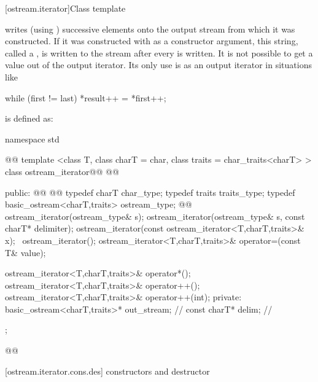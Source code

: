 %
\begin{itemdescr}
\pnum
\returns
{}
\end{itemdescr}

[ostream.iterator]{Class template }

\pnum
{}%
writes (using
)
successive elements onto the output stream from which it was constructed.
If it was constructed with
as a constructor argument, this string, called a
,
is written to the stream after every
is written.
It is not possible to get a value out of the output iterator.
Its only use is as an output iterator in situations like

\begin{codeblock}
while (first != last)
  *result++ = *first++;
\end{codeblock}

\pnum
{}
is defined as:

\begin{codeblock}
namespace std { @@
  template <class T, class charT = char, class traits = char_traits<charT> >
  class ostream_iterator@\removed{:}@
    @@ {
  public:
    @@
    @@
    typedef charT char_type;
    typedef traits traits_type;
    typedef basic_ostream<charT,traits> ostream_type;
    @@
    ostream_iterator(ostream_type& s);
    ostream_iterator(ostream_type& s, const charT* delimiter);
    ostream_iterator(const ostream_iterator<T,charT,traits>& x);
   ~ostream_iterator();
    ostream_iterator<T,charT,traits>& operator=(const T& value);

    ostream_iterator<T,charT,traits>& operator*();
    ostream_iterator<T,charT,traits>& operator++();
    ostream_iterator<T,charT,traits>& operator++(int);
  private:
    basic_ostream<charT,traits>* out_stream;  // \expos
    const charT* delim;                       // \expos
  };
}@\newtxt{\}\}}@
\end{codeblock}

[ostream.iterator.cons.des]{ constructors and destructor}

